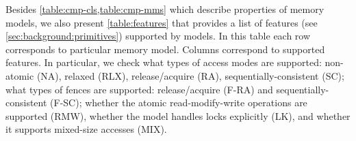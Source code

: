 Besides \cref{table:cmp-cls,table:cmp-mms} which describe 
properties of memory models, we also present \cref{table:features}
that provides a list of features (see \cref{sec:background:primitives}) 
supported by models.
In this table each row corresponds to particular memory model. 
Columns correspond to supported features. 
In particular, we check what types of access modes are supported:
non-atomic (NA), relaxed (RLX), release/acquire (RA), sequentially-consistent (SC); 
what types of fences are supported: release/acquire (F-RA) and sequentially-consistent (F-SC);
whether the atomic read-modify-write operations are supported (RMW),
whether the model handles locks explicitly (LK),
and whether it supports mixed-size accesses (MIX).


